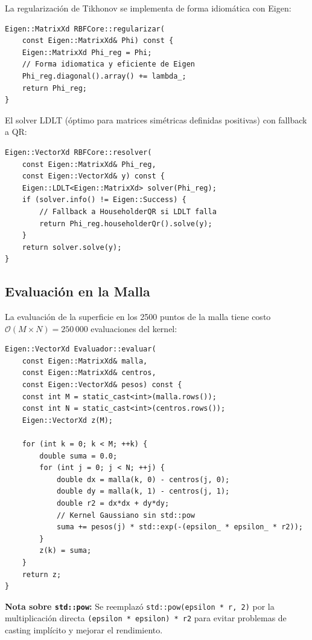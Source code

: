 \documentclass[12pt,a4paper]{article}
\theoremstyle{definition}
\begin{document}
La regularizaci\'{o}n de Tikhonov se implementa de forma idiom\'{a}tica con Eigen:

\begin{lstlisting}[caption={Regularizaci\'{o}n de Tikhonov.}]
Eigen::MatrixXd RBFCore::regularizar(
    const Eigen::MatrixXd& Phi) const {
    Eigen::MatrixXd Phi_reg = Phi;
    // Forma idiomatica y eficiente de Eigen
    Phi_reg.diagonal().array() += lambda_;
    return Phi_reg;
}
\end{lstlisting}

El solver LDLT (\'{o}ptimo para matrices sim\'{e}tricas definidas positivas) con fallback a QR:

\begin{lstlisting}[caption={Solver LDLT con fallback a QR.}]
Eigen::VectorXd RBFCore::resolver(
    const Eigen::MatrixXd& Phi_reg,
    const Eigen::VectorXd& y) const {
    Eigen::LDLT<Eigen::MatrixXd> solver(Phi_reg);
    if (solver.info() != Eigen::Success) {
        // Fallback a HouseholderQR si LDLT falla
        return Phi_reg.householderQr().solve(y);
    }
    return solver.solve(y);
}
\end{lstlisting}

\subsection{Evaluaci\'{o}n en la Malla}

La evaluaci\'{o}n de la superficie en los 2500 puntos de la malla tiene costo $\mathcal{O}(M \times N) = 250\,000$ evaluaciones del kernel:

\begin{lstlisting}[caption={Evaluaci\'{o}n de la superficie RBF.}]
Eigen::VectorXd Evaluador::evaluar(
    const Eigen::MatrixXd& malla,
    const Eigen::MatrixXd& centros,
    const Eigen::VectorXd& pesos) const {
    const int M = static_cast<int>(malla.rows());
    const int N = static_cast<int>(centros.rows());
    Eigen::VectorXd z(M);
    
    for (int k = 0; k < M; ++k) {
        double suma = 0.0;
        for (int j = 0; j < N; ++j) {
            double dx = malla(k, 0) - centros(j, 0);
            double dy = malla(k, 1) - centros(j, 1);
            double r2 = dx*dx + dy*dy;
            // Kernel Gaussiano sin std::pow
            suma += pesos(j) * std::exp(-(epsilon_ * epsilon_ * r2));
        }
        z(k) = suma;
    }
    return z;
}
\end{lstlisting}

\textbf{Nota sobre \texttt{std::pow}:} Se reemplaz\'{o} \texttt{std::pow(epsilon * r, 2)} por la multiplicaci\'{o}n directa \texttt{(epsilon * epsilon) * r2} para evitar problemas de casting impl\'{i}cito y mejorar el rendimiento.
\end{document}
